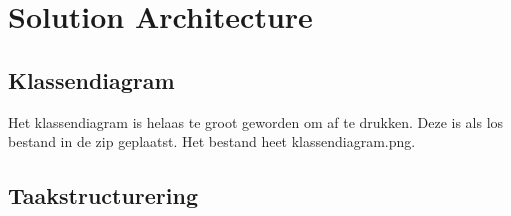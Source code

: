 \chapter{Solution Architecture}
\section{Klassendiagram}
Het klassendiagram is helaas te groot geworden om af te drukken. Deze is als los bestand in de zip geplaatst. Het bestand heet klassendiagram.png.

\section{Taakstructurering}

